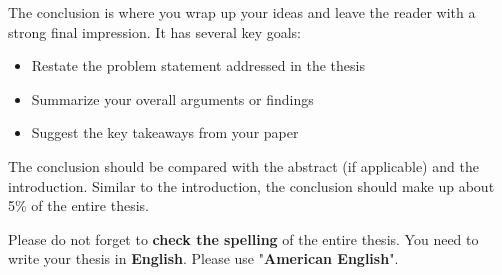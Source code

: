 The conclusion is where you wrap up your ideas and leave the reader with a strong final impression. It has several key goals:

\begin{itemize}[label=-, topsep=0pt,itemsep=-1ex,partopsep=0ex,parsep=1ex]
    \item Restate the problem statement addressed in the thesis
    \item Summarize your overall arguments or findings
    \item Suggest the key takeaways from your paper
\end{itemize}

The conclusion should be compared with the abstract (if applicable) and the introduction. Similar to the introduction, the conclusion should make up about 5\% of the entire thesis.

Please do not forget to \textbf{check the spelling} of the entire thesis. You need to write your thesis in \textbf{English}. Please use "\textbf{American English}".